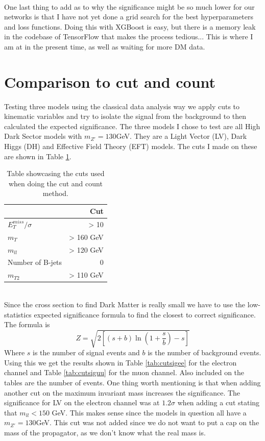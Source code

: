 \documentclass[14pt, a4paper]{book}
\begin{document}
\\One last thing to add as to why the significance might be so much lower for our networks is that I have not yet done a grid search for the best hyperparameters and loss functions. Doing this with XGBoost is easy, but there is a memory leak in the codebase of TensorFlow that makes the process tedious... This is where I am at in the present time, as well as waiting for more DM data.

\section{Comparison to cut and count}
Testing three models using the classical data analysis way we apply cuts to kinematic variables and try to isolate the signal from the background to then calculated the expected significance. The three models I chose to test are all High Dark Sector models with $m_{Z'}=130$GeV. They are a Light Vector (LV), Dark Higgs (DH) and Effective Field Theory (EFT) models. The cuts I made on these are shown in Table \ref{tab:cuts}.
\begin{table}[!h]
    \centering
    \begin{tabular}{l|r}\midrule\midrule
                                & Cut\\\midrule
         $E_T^{miss}/\sigma$    & > 10      \\
         $m_T$                  & > 160 GeV \\
         $m_{ll}$               & > 120 GeV \\
         Number of B-jets       & 0         \\
         $m_{T2}$               & > 110 GeV \\\midrule\midrule
    \end{tabular}
    \caption[Cut and count cuts]{Table showcasing the cuts used when doing the cut and count method.}
    \label{tab:cuts}
\end{table}
\\ Since the cross section to find Dark Matter is really small we have to use the low-statistics expected significance formula to find the closest to correct significance. The formula is
\begin{equation}\label{eq:low_stat_Z}
    Z = \sqrt{2\left[(s + b)\ln(1 + \frac{s}{b}) - s \right]}
\end{equation}
Where $s$ is the number of signal events and $b$ is the number of background events. Using this we get the results shown in Table \ref{tab:cutsigee} for the electron channel and Table \ref{tab:cutsiguu} for the muon channel. Also included on the tables are the number of events. One thing worth mentioning is that when adding another cut on the maximum invariant mass increases the significance. The significance for LV on the electron channel was at $1.2\sigma$ when adding a cut stating that $m_{ll}<150$ GeV. This makes sense since the models in question all have a $m_{Z'}=130$GeV. This cut was not added since we do not want to put a cap on the mass of the propagator, as we don't know what the real mass is.
\end{document}

